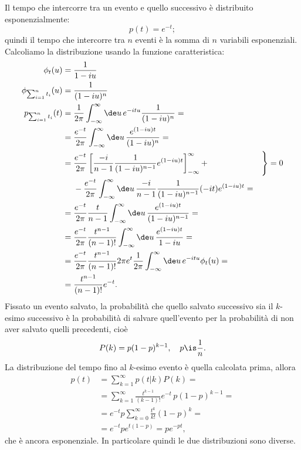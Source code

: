 \begin{solution}
	Il tempo che intercorre tra un evento e quello successivo è distribuito esponenzialmente:
	\begin{equation*}
		p(t) = e^{-t};
	\end{equation*}
	quindi il tempo che intercorre tra $n$ eventi è la somma di $n$ variabili esponenziali.
	Calcoliamo la distribuzione usando la funzione caratteristica:
	\begin{align*}
		\phi_t(u) &= \frac1{1-iu} \\
		\phi_{\sum_{i=1}^n t_i}(u) &= \frac1{(1-iu)^n} \\
		p_{\sum_{i=1}^n t_i}(t)
		&= \frac1{2\pi} \int_{-\infty}^\infty \de u\, e^{-itu} \frac1{(1-iu)^n} = \\
		&= \frac{e^{-t}}{2\pi} \int_{-\infty}^\infty \de u\, \frac{e^{(1-iu)t}}{(1-iu)^n} = \\
		&= \frac{e^{-t}}{2\pi}
		\left[ \frac{-i}{n-1} \frac1{(1-iu)^{n-1}} e^{(1-iu)t} \right]_{-\infty}^\infty + & \Bigg\} =0\\
		&\phantom{{}={}} - \frac{e^{-t}}{2\pi}
		\int_{-\infty}^\infty \de u\, \frac{-i}{n-1} \frac1{(1-iu)^{n-1}} (-it) e^{(1-iu)t} = \\
		&= \frac{e^{-t}}{2\pi} \frac{t}{n-1} \int_{-\infty}^\infty \de u\, \frac{e^{(1-iu)t}}{(1-iu)^{n-1}} = \\
		&= \frac{e^{-t}}{2\pi} \frac{t^{n-1}}{(n-1)!} \int_{-\infty}^\infty \de u\, \frac{e^{(1-iu)t}}{1-iu} = \\
		&= \frac{e^{-t}}{2\pi} \frac{t^{n-1}}{(n-1)!} 2\pi e^t \frac1{2\pi} \int_{-\infty}^\infty \de u\, e^{-itu} \phi_t(u) = \\
		&= \frac{t^{n-1}}{(n-1)!} e^{-t}.
	\end{align*}
	Fissato un evento salvato, la probabilità che quello salvato successivo sia il $k$-esimo successivo è la probabilità di salvare quell'evento per la probabilità di non aver salvato quelli precedenti, cioè
	\begin{equation*}
		P(k) = p(1-p)^{k-1}, \quad p\is\frac1n.
	\end{equation*}
	La distribuzione del tempo fino al $k$-esimo evento è quella calcolata prima, allora
	\begin{align*}
		p(t) &= \sum_{k=1}^\infty p(t|k) P(k) = \\
		&= \sum_{k=1}^\infty \frac{t^{k-1}}{(k-1)!}e^{-t} \,  p(1-p)^{k-1} = \\
		&= e^{-t}p \sum_{k=0}^\infty \frac{t^k}{k!}(1-p)^k = \\
		&= e^{-t}p e^{t(1-p)} = pe^{-pt},
	\end{align*}
	che è ancora esponenziale.
	In particolare quindi le due distribuzioni sono diverse.
\end{solution}

